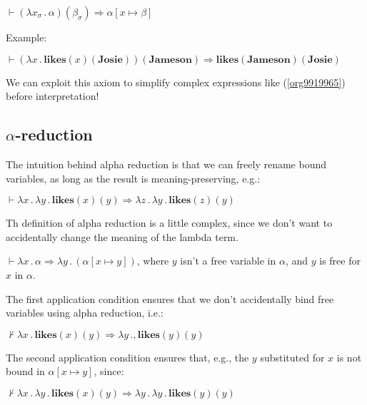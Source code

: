 \documentclass[letterpaper,parskip=half]{scrartcl}
\begin{document}
\begin{exe}
\ex \(\vdash (\lambda x_\sigma \,.\,\alpha)(\beta_\sigma) \Rightarrow \alpha[x \mapsto \beta]\)
\label{org5a18257}
\end{exe}

Example:

\begin{exe}
\ex \(\vdash (\lambda x\,.\,\mathbf{likes}(x)(\mathbf{Josie}))(\mathbf{Jameson}) \Rightarrow \mathbf{likes}(\mathbf{Jameson})(\mathbf{Josie})\)
\label{org9919965}
\end{exe}

We can exploit this axiom to simplify complex expressions like (\ref{org9919965}) before interpretation!


\subsection{\(\alpha\)-reduction}
\label{sec:org9aefb62}

The intuition behind alpha reduction is that we can freely rename bound variables, as long as the result is meaning-preserving, e.g.:

\begin{exe}
\ex \(\vdash \lambda x\,.\,\lambda y\,.\,\mathbf{likes}(x)(y) \Rightarrow \lambda z\,.\,\lambda y\,.\,\mathbf{likes}(z)(y)\)
\label{orgac6238c}
\end{exe}

Th definition of alpha reduction is a little complex, since we don't want to accidentally change the meaning of the lambda term.

\begin{exe}
\ex \(\vdash \lambda x\,.\,\alpha \Rightarrow\lambda y\,.\,(\alpha[x \mapsto y])\), where \(y\) isn't a free variable in \(\alpha\), and \(y\) is free for \(x\) in \(\alpha\).
\label{org5b9c5d5}
\end{exe}

The first application condition ensures that we don't accidentally bind free variables using alpha reduction, i.e.:

\begin{exe}
\ex \(\nvdash \lambda x\,.\,\mathbf{likes}(x)(y) \Rightarrow \lambda y\,.,\mathbf{likes}(y)(y)\)
\label{org4edcd5a}
\end{exe}

The second application condition ensures that, e.g., the \(y\) substituted for \(x\) is not bound in \(\alpha [x \mapsto y]\), since: 

\begin{exe}
\ex \(\nvdash \lambda x\,.\,\lambda y\,.\,\mathbf{likes}(x)(y) \Rightarrow \lambda y\,.\,\lambda y\,.\,\mathbf{likes}(y)(y)\)
\label{orgfb8771f}
\end{exe}
\end{document}
